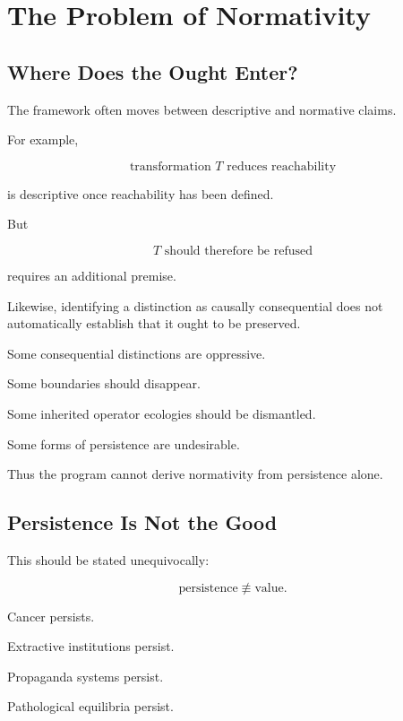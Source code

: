 \documentclass[11pt]{article}
\theoremstyle{remark}
\begin{document}
\section{The Problem of Normativity}

\subsection{Where Does the Ought Enter?}

The framework often moves between descriptive and normative claims.

For example,

\begin{equation}
\text{transformation }T
\text{ reduces reachability}
\end{equation}

is descriptive once reachability has been defined.

But

\begin{equation}
T
\text{ should therefore be refused}
\end{equation}

requires an additional premise.

Likewise, identifying a distinction as causally consequential does not automatically establish that it ought to be preserved.

Some consequential distinctions are oppressive.

Some boundaries should disappear.

Some inherited operator ecologies should be dismantled.

Some forms of persistence are undesirable.

Thus the program cannot derive normativity from persistence alone.

\subsection{Persistence Is Not the Good}

This should be stated unequivocally:

\begin{equation}
\boxed{
\text{persistence}
\not\equiv
\text{value}.
}
\end{equation}

Cancer persists.

Extractive institutions persist.

Propaganda systems persist.

Pathological equilibria persist.
\end{document}
